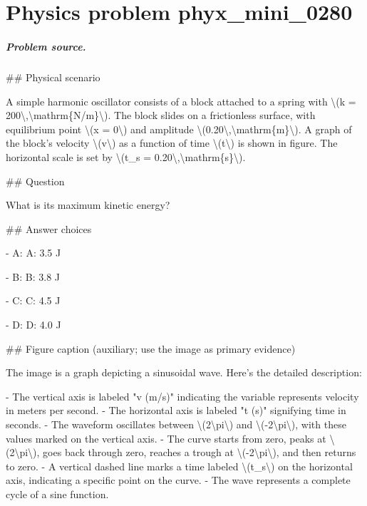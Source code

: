 
\chapter{Physics problem phyx\_mini\_0280}
\label{ch:PhyXMiniProblems_problem_phyx_mini_0280}

\paragraph{Problem source.}
\#\# Physical scenario

A simple harmonic oscillator consists of a block attached to a spring with \textbackslash{}(k = 200\textbackslash{},\textbackslash{}mathrm\{N/m\}\textbackslash{}). The block slides on a frictionless surface, with equilibrium point \textbackslash{}(x = 0\textbackslash{}) and amplitude \textbackslash{}(0.20\textbackslash{},\textbackslash{}mathrm\{m\}\textbackslash{}). A graph of the block's velocity \textbackslash{}(v\textbackslash{}) as a function of time \textbackslash{}(t\textbackslash{}) is shown in figure. The horizontal scale is set by \textbackslash{}(t\_s = 0.20\textbackslash{},\textbackslash{}mathrm\{s\}\textbackslash{}).

\#\# Question

What is its maximum kinetic energy?

\#\# Answer choices

- A: A: 3.5 J

- B: B: 3.8 J

- C: C: 4.5 J

- D: D: 4.0 J

\#\# Figure caption (auxiliary; use the image as primary evidence)

The image is a graph depicting a sinusoidal wave. Here's the detailed description:

- The vertical axis is labeled "v (m/s)" indicating the variable represents velocity in meters per second.
- The horizontal axis is labeled "t (s)" signifying time in seconds.
- The waveform oscillates between \textbackslash{}(2\textbackslash{}pi\textbackslash{}) and \textbackslash{}(-2\textbackslash{}pi\textbackslash{}), with these values marked on the vertical axis.
- The curve starts from zero, peaks at \textbackslash{}(2\textbackslash{}pi\textbackslash{}), goes back through zero, reaches a trough at \textbackslash{}(-2\textbackslash{}pi\textbackslash{}), and then returns to zero.
- A vertical dashed line marks a time labeled \textbackslash{}(t\_s\textbackslash{}) on the horizontal axis, indicating a specific point on the curve.
- The wave represents a complete cycle of a sine function.

